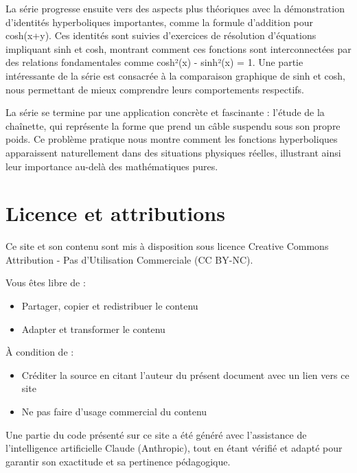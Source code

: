 \documentclass[
  12pt,
  letterpaper,
]{book}
\providecommand{\tightlist}{%
  \setlength{\itemsep}{0pt}\setlength{\parskip}{0pt}}\usepackage{longtable,booktabs,array}
\theoremstyle{remark}
\begin{document}
La série progresse ensuite vers des aspects plus théoriques avec la
démonstration d'identités hyperboliques importantes, comme la formule
d'addition pour cosh(x+y). Ces identités sont suivies d'exercices de
résolution d'équations impliquant sinh et cosh, montrant comment ces
fonctions sont interconnectées par des relations fondamentales comme
cosh²(x) - sinh²(x) = 1. Une partie intéressante de la série est
consacrée à la comparaison graphique de sinh et cosh, nous permettant de
mieux comprendre leurs comportements respectifs.

La série se termine par une application concrète et fascinante : l'étude
de la chaînette, qui représente la forme que prend un câble suspendu
sous son propre poids. Ce problème pratique nous montre comment les
fonctions hyperboliques apparaissent naturellement dans des situations
physiques réelles, illustrant ainsi leur importance au-delà des
mathématiques pures.

\hypertarget{licence-et-attributions}{%
\section*{Licence et attributions}\label{licence-et-attributions}}


Ce site et son contenu sont mis à disposition sous licence Creative
Commons Attribution - Pas d'Utilisation Commerciale (CC BY-NC).

\begin{tcolorbox}[enhanced jigsaw, titlerule=0mm, opacityback=0, opacitybacktitle=0.6, colbacktitle=quarto-callout-note-color!10!white, breakable, arc=.35mm, title=\textcolor{quarto-callout-note-color}{\faInfo}\hspace{0.5em}{Droits d'utilisation}, colframe=quarto-callout-note-color-frame, toptitle=1mm, bottomrule=.15mm, bottomtitle=1mm, rightrule=.15mm, toprule=.15mm, leftrule=.75mm, colback=white, left=2mm, coltitle=black]

Vous êtes libre de :

\begin{itemize}
\tightlist
\item
  Partager, copier et redistribuer le contenu
\item
  Adapter et transformer le contenu
\end{itemize}

À condition de :

\begin{itemize}
\tightlist
\item
  Créditer la source en citant l'auteur du présent document avec un lien
  vers ce site
\item
  Ne pas faire d'usage commercial du contenu
\end{itemize}

Une partie du code présenté sur ce site a été généré avec l'assistance
de l'intelligence artificielle Claude (Anthropic), tout en étant vérifié
et adapté pour garantir son exactitude et sa pertinence pédagogique.

\end{tcolorbox}
\end{document}
